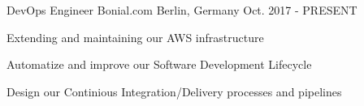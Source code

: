 \begin{cventries}
\cventry
{DevOps Engineer} %
{Bonial.com} %
{Berlin, Germany} %
{Oct. 2017 - PRESENT} %
{ %
\begin{cvitems}
\item {Extending and maintaining our AWS infrastructure}
\item {Automatize and improve our Software Development Lifecycle}
\item {Design our Continious Integration/Delivery processes and pipelines}
\end{cvitems}
}



\end{cventries}